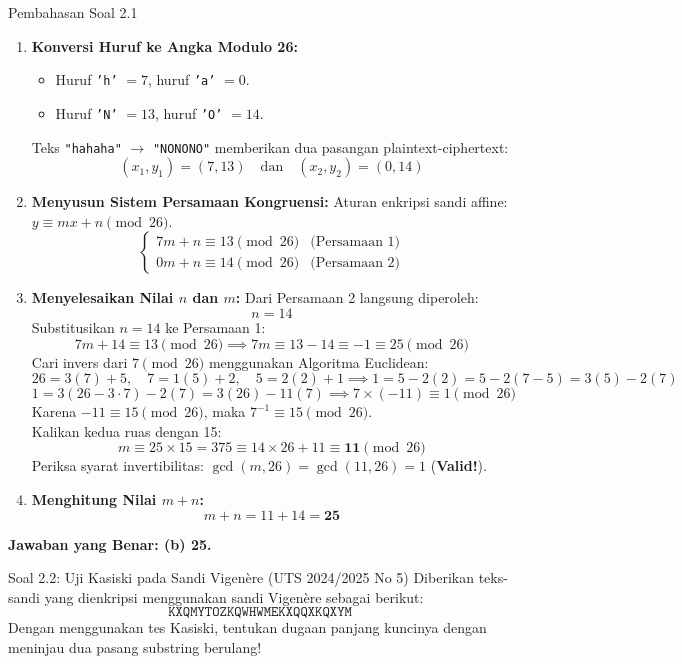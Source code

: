 \documentclass[11pt,a4paper]{article}
\begin{document}
\begin{solusibox}{Pembahasan Soal 2.1}
\begin{enumerate}[leftmargin=*]
    \item \textbf{Konversi Huruf ke Angka Modulo 26:}
    \begin{itemize}
        \item Huruf \texttt{'h'} $= 7$, huruf \texttt{'a'} $= 0$.
        \item Huruf \texttt{'N'} $= 13$, huruf \texttt{'O'} $= 14$.
    \end{itemize}
    Teks \texttt{"hahaha"} $\to$ \texttt{"NONONO"} memberikan dua pasangan plaintext-ciphertext:
    \[
    (x_1, y_1) = (7, 13) \quad \text{dan} \quad (x_2, y_2) = (0, 14)
    \]
    \item \textbf{Menyusun Sistem Persamaan Kongruensi:}
    Aturan enkripsi sandi affine: $y \equiv m x + n \pmod{26}$.
    \[
    \begin{cases}
    7m + n \equiv 13 \pmod{26} & \text{(Persamaan 1)} \\
    0m + n \equiv 14 \pmod{26} & \text{(Persamaan 2)}
    \end{cases}
    \]
    \item \textbf{Menyelesaikan Nilai $n$ dan $m$:}
    Dari Persamaan 2 langsung diperoleh:
    \[
    n = 14
    \]
    Substitusikan $n = 14$ ke Persamaan 1:
    \[
    7m + 14 \equiv 13 \pmod{26} \implies 7m \equiv 13 - 14 \equiv -1 \equiv 25 \pmod{26}
    \]
    Cari invers dari $7 \pmod{26}$ menggunakan Algoritma Euclidean:
    \[
    26 = 3(7) + 5, \quad 7 = 1(5) + 2, \quad 5 = 2(2) + 1 \implies 1 = 5 - 2(2) = 5 - 2(7 - 5) = 3(5) - 2(7)
    \]
    \[
    1 = 3(26 - 3 \cdot 7) - 2(7) = 3(26) - 11(7) \implies 7 \times (-11) \equiv 1 \pmod{26}
    \]
    Karena $-11 \equiv 15 \pmod{26}$, maka $7^{-1} \equiv 15 \pmod{26}$.\\
    Kalikan kedua ruas dengan 15:
    \[
    m \equiv 25 \times 15 = 375 \equiv 14 \times 26 + 11 \equiv \mathbf{11} \pmod{26}
    \]
    Periksa syarat invertibilitas: $\gcd(m, 26) = \gcd(11, 26) = 1$ (\textbf{Valid!}).
    \item \textbf{Menghitung Nilai $m + n$:}
    \[
    m + n = 11 + 14 = \mathbf{25}
    \]
\end{enumerate}
\textbf{Jawaban yang Benar: (b) 25.}
\end{solusibox}

\vspace{0.4cm}

\begin{soalbox}{Soal 2.2: Uji Kasiski pada Sandi Vigen\`ere (UTS 2024/2025 No 5)}
Diberikan teks-sandi yang dienkripsi menggunakan sandi Vigen\`ere sebagai berikut:
\[
\texttt{KXQMYTOZKQWHWMEKXQQXKQXYM}
\]
Dengan menggunakan tes Kasiski, tentukan dugaan panjang kuncinya dengan meninjau dua pasang substring berulang!
\end{soalbox}
\end{document}
